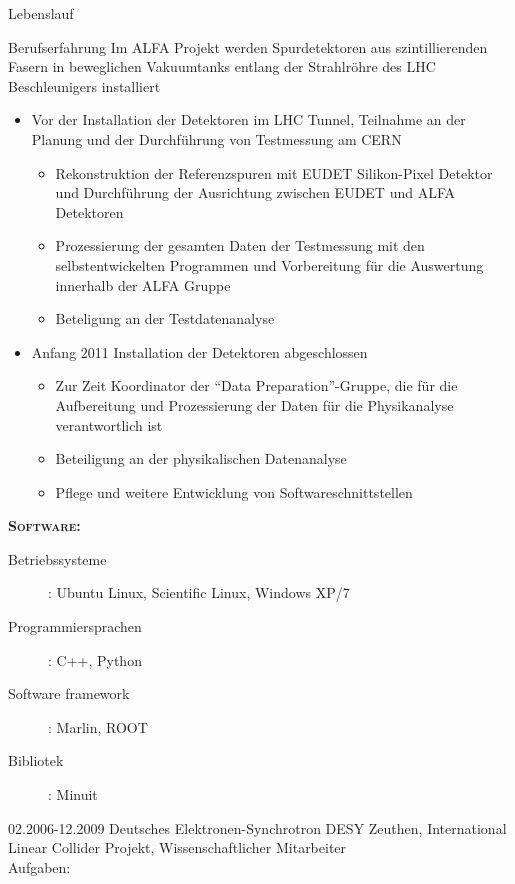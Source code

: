 \documentclass[11pt,a4paper]{scrartcl}
\begin{document}
\begin{cv}{Lebenslauf}
\begin{cvlist}{Berufserfahrung}
Im ALFA Projekt werden Spurdetektoren aus szintillierenden Fasern
in beweglichen Vakuumtanks entlang der Strahlr{\"o}hre des LHC
Beschleunigers installiert
\begin{itemize}
  \item Vor der Installation der Detektoren im LHC Tunnel, Teilnahme
  an der Planung und der Durchf{\"u}hrung von Testmessung am CERN
  \begin{itemize}
    \item Rekonstruktion der Referenzspuren mit EUDET Silikon-Pixel
    Detektor und Durchf{\"u}hrung der Ausrichtung zwischen EUDET
    und ALFA Detektoren
    \item Prozessierung der gesamten Daten der Testmessung mit den
    selbstentwickelten Programmen und Vorbereitung f{\"u}r die
    Auswertung innerhalb der ALFA Gruppe
    \item Beteligung an der Testdatenanalyse
  \end{itemize}
  \item Anfang 2011 Installation der Detektoren abgeschlossen
  \begin{itemize}
    \item Zur Zeit Koordinator der "`Data Preparation"'-Gruppe, die
    f{\"u}r die Aufbereitung und Prozessierung der Daten f{\"u}r
    die Physikanalyse verantwortlich ist
    \item Beteiligung an der physikalischen Datenanalyse
    \item Pflege und weitere Entwicklung von Softwareschnittstellen
  \end{itemize}
\end{itemize}

{\scshape {\bfseries Software:}}
\begin{description}
\item[Betriebssysteme] : Ubuntu Linux, Scientific Linux, Windows
XP/7
\item[Programmiersprachen] : C++, Python
\item[Software framework] : Marlin, ROOT
\item[Bibliotek] : Minuit
\end{description}

\item[02.2006-12.2009] Deutsches Elektronen-Synchrotron DESY Zeuthen,
International Linear Collider Projekt, Wissenschaftlicher Mitarbeiter \\

Aufgaben:\\


\end{cvlist}
\end{cv}
\end{document}

